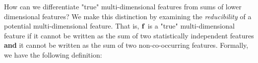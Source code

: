 \documentclass{article} %
\theoremstyle{plain}
\theoremstyle{definition}
\begin{document}

How can we differentiate "true" multi-dimensional features from sums of lower dimensional features? We make this distinction by examining the \textit{reducibility} of a potential multi-dimensional feature. That is, ${\mathbf f}$ is a "true" multi-dimensional feature if it cannot be written as the sum of two statistically independent features \textbf{and} it cannot be written as the sum of two non-co-occurring features. Formally, we have the following definition:




\end{document}
